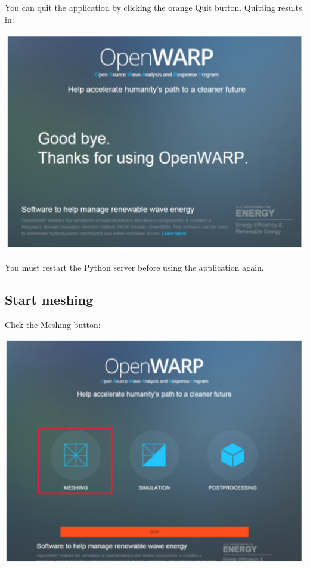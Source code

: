 \documentclass[12pt]{article}
\begin{document}
	You can quit the application by clicking the orange Quit button. Quitting results in:
	
		\vspace{\abovedisplayskip}
		\begin{minipage}{\linewidth}
			\centering
			\includegraphics[scale=0.5]{img/21}
		\end{minipage}
		\vspace{\belowdisplayskip}
		
		You must restart the Python server before using the application again.
		\subsection{Start meshing}
		Click the Meshing button:
		
			\vspace{\abovedisplayskip}
			\begin{minipage}{\linewidth}
				\centering
				\includegraphics[scale=0.4]{img/22}
			\end{minipage}
			\vspace{\belowdisplayskip}
			
\end{document}
